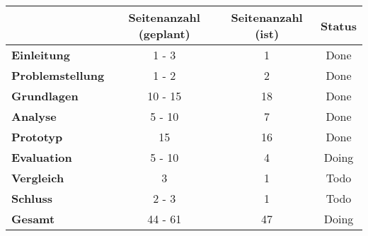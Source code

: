 \begin{table}[H]
\centering
\begin{tabular}{l|c|c|c}
                               & \textbf{Seitenanzahl (geplant)} & \textbf{Seitenanzahl (ist)} & \textbf{Status}        \\ \hline
\textbf{Einleitung}            & 1 - 3                           & {\color{green} 1}          & {\color{green} Done}    \\ \hline
\textbf{Problemstellung}       & 1 - 2                           & {\color{green} 2}           & {\color{green} Done}   \\ \hline
\textbf{Grundlagen}            & 10 - 15                         & {\color{green} 18}         & {\color{green} Done}    \\ \hline
\textbf{Analyse}               & 5 - 10                          & {\color{green} 7}           & {\color{green} Done}   \\ \hline
\textbf{Prototyp}              & 15                              & {\color{green} 16}         & {\color{green} Done}    \\ \hline
\textbf{Evaluation}            & 5 - 10                          & {\color{red} 4}             & {\color{yellow} Doing} \\ \hline
\textbf{Vergleich}             & 3                               & {\color{red} 1}             & {\color{red} Todo}     \\ \hline
\textbf{Schluss}               & 2 - 3                           & {\color{red} 1}             & {\color{red} Todo}     \\ \hline
\textbf{Gesamt}                & 44 - 61                         & {\color{green} 47}         & {\color{yellow} Doing}  \\
\end{tabular}
\end{table}